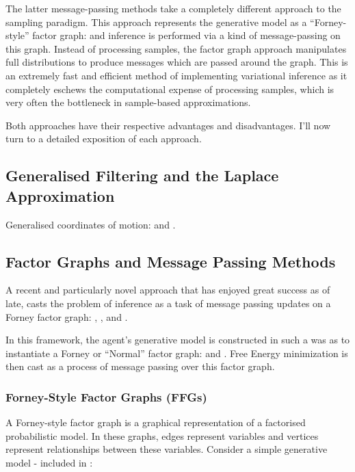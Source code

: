\documentclass[onecolumn]{IEEEtran}
\begin{document}
The latter message-passing methods take a completely different approach to the sampling paradigm. This approach represents the generative model as a ``Forney-style'' factor graph: \textcite{Codes-on-Graphs} and inference is performed via a kind of message-passing on this graph.  
Instead of processing samples, the factor graph approach manipulates full distributions to produce messages which are passed around the graph. This is an extremely fast and efficient method of implementing variational inference as it completely eschews the computational expense of processing samples, which is very often the bottleneck in sample-based approximations. 

Both approaches have their respective advantages and disadvantages. I'll now turn to a detailed exposition of each approach. 

\subsection{Generalised Filtering and the Laplace Approximation}

Generalised coordinates of motion: \textcite{Generalized-Filtering} and \textcite{Bayes-State-Estimation}.

\subsection{Factor Graphs and Message Passing Methods}

A recent and particularly novel approach that has enjoyed great success as of late, casts the problem of inference as a task of message passing updates on a Forney factor graph: \textcite{Factor-Graph-Approach-Automated-Design-Bayesian-Algos}, \textcite{Simulating-AIF-By-Message-Passing}, \textcite{Factor-Graph-Desc-Deep-Temp-AIF} and \textcite{Reactive-MP}. 

In this framework, the agent's generative model is constructed in such a was as to instantiate a Forney or ``Normal'' factor graph: \textcite{Codes-on-Graphs} and \textcite{Intro-to-Factor-Graphs}. Free Energy minimization is then cast as a process of message passing over this factor graph. 

\vspace{12pt}
\subsubsection{Forney-Style Factor Graphs (FFGs)}
A Forney-style factor graph is a graphical representation of a factorised probabilistic model. In these graphs, edges represent variables and vertices represent relationships between these variables. Consider a simple generative model - included in \textcite{Factor-Graph-Approach-Automated-Design-Bayesian-Algos}:
\end{document}
